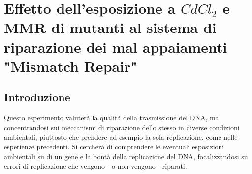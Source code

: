 \section*{Effetto dell'esposizione a \emph{$CdCl_{2}$} e MMR di mutanti al sistema di riparazione dei mal appaiamenti "Mismatch Repair"}

	\subsection*{Introduzione}
	Questo esperimento valuterà la qualità della trasmissione del DNA, ma concentrandosi sui meccanismi di riparazione dello stesso in diverse condizioni ambientali, piuttosto che prendere ad esempio la sola replicazione, come nelle esperienze precedenti. 
	Si cercherà di comprendere le eventuali esposizioni ambientali su di un gene e la bontà della replicazione del DNA, focalizzandosi su errori di replicazione che vengono - o non vengono - riparati. 

 
